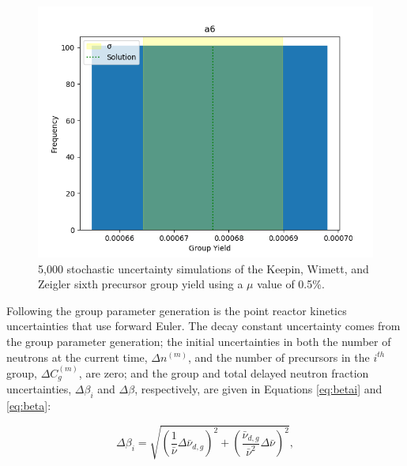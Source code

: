 \documentclass{style/nseJournal}
\begin{document}
\begin{figure}
    \centering
    \includegraphics[scale=0.55]{images/ga6-yield-MC.png}
    \caption{5,000 stochastic uncertainty simulations of the Keepin, Wimett, and Zeigler sixth precursor group yield using a $\mu$ value of 0.5\%.}
    \label{fig:a6-uncert}
\end{figure}





Following the group parameter generation is the point reactor kinetics uncertainties that use forward Euler. The decay constant uncertainty comes from the group parameter generation; the initial uncertainties in both the number of neutrons at the current time, $\Delta n^{(m)}$, and the number of precursors in the $i^{th}$ group, $\Delta C_g^{(m)}$, are zero; and the group and total delayed neutron fraction uncertainties, $\Delta \beta_{i}$ and $\Delta \beta$, respectively, are given in Equations \eqref{eq:betai} and \eqref{eq:beta}:


\begin{equation}
\Delta \beta_{i} = \sqrt{ \left(\frac{1}{\bar{\nu}} \Delta\bar{\nu}_{d, g} \right)^2 +
\left( \frac{\bar{\nu}_{d, g}}{\bar{\nu}^2} \Delta \bar{\nu} \right)^2}
\label{eq:betai},
\end{equation}
\end{document}
